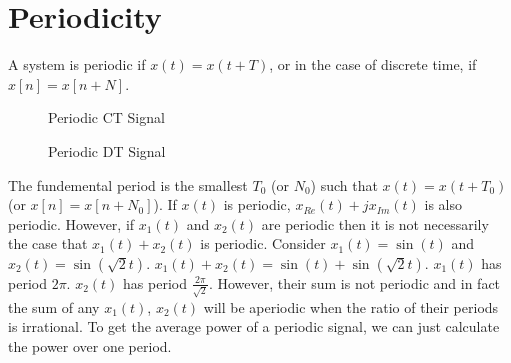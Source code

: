 \section{Periodicity}

A system is periodic if $x(t) = x(t + T)$, or 
in the case of discrete time, if $x[n] = x[n + N]$. 

\begin{figure}
    \centering
    \caption{Periodic CT Signal}
\end{figure}
    
\begin{figure}
    \centering
    \caption{Periodic DT Signal}
\end{figure}

The fundemental period is the smallest $T_0$ (or $N_0$) such 
that $x(t) = x(t + T_0)$ (or $x[n] = x[n + N_0]$). If $x(t)$ is periodic, $x_{Re}(t) + j x_{Im}(t)$ is also 
periodic. However, if $x_1(t)$ and $x_2(t)$ are periodic then it is not 
necessarily the case that $x_1(t) + x_2(t)$ is 
periodic. Consider $x_1(t) = \sin(t)$ and 
$x_2(t) = \sin(\sqrt{2} t)$. $x_1(t) + x_2(t) = \sin(t) + \sin(\sqrt{2}t)$.
$x_1(t)$ has period $2\pi$. $x_2(t)$ has period $\frac{2\pi}{\sqrt{2}}$. 
However, their sum is not periodic and in fact the sum of 
any $x_1(t)$, $x_2(t)$ will be aperiodic when the ratio 
of their periods is irrational. 
To get the average power of a periodic signal, 
we can just calculate the power over one period. 

